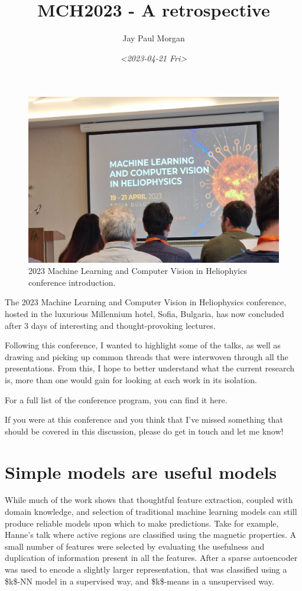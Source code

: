 \documentclass[11pt]{article}
\author{Jay Paul Morgan}
\date{\textit{<2023-04-21 Fri>}}
\title{MCH2023 - A retrospective}
\begin{document}
\maketitle
\tableofcontents

\begin{figure}[htbp]
\centering
\includegraphics[width=1.0\textwidth]{images/20230419_085440.jpg}
\caption{2023 Machine Learning and Computer Vision in Heliophyics conference introduction.}
\end{figure}

The 2023 Machine Learning and Computer Vision in Heliophysics
conference, hosted in the luxurious Millennium hotel, Sofia, Bulgaria,
has now concluded after 3 days of interesting and thought-provoking
lectures.

Following this conference, I wanted to highlight some of the talks, as
well as drawing and picking up common threads that were interwoven
through all the presentations. From this, I hope to better understand
what the current research is, more than one would gain for looking at
each work in its isolation.

For a full list of the conference program, you can find it here.

If you were at this conference and you think that I've missed
something that should be covered in this discussion, please do get in
touch and let me know!

\section{Simple models are useful models}
\label{sec:org44dbf62}

While much of the work shows that thoughtful feature extraction,
coupled with domain knowledge, and selection of traditional machine
learning models can still produce reliable models upon which to make
predictions. Take for example, Hanne's talk where active regions are
classified using the magnetic properties. A small number of features
were selected by evaluating the usefulness and duplication of
information present in all the features. After a sparse autoencoder
was used to encode a slightly larger representation, that was
classified using a \$k\$-NN model in a supervised way, and \$k\$-means in
a unsupervised way.
\end{document}
